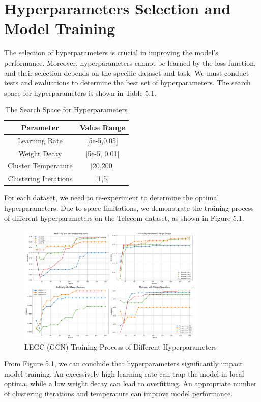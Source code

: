 \documentclass[ %
                    author={Tengyao Tu},
                supervisor={Dr. James Pope},
                    degree={MSc},
                     title={A New Perspective on Graph Community Detection: Combining Traditional Methods with Deep Learning Approaches},
                  subtitle={Applying to Telecom Networks and Diverse Datasets},
                      type={},
                      year={2024}]{dissertation}
\begin{document}
\section{Hyperparameters Selection and Model Training}
The selection of hyperparameters is crucial in improving the model's performance. Moreover, hyperparameters cannot be learned by the loss function, and their selection depends on the specific dataset and task. We must conduct tests and evaluations to determine the best set of hyperparameters. The search space for hyperparameters is shown in Table 5.1.
\begin{table}[!htbp] 
\centering 
\label{Basic Infomation} 
\caption{The Search Space for Hyperparameters} 
\vspace{5pt} 
\begin{tabular}{cc} 
\hline 
Parameter &Value Range \\ 
\hline
Learning Rate& [5e-5,0.05]\\
Weight Decay&[5e-5, 0.01]\\
Cluster Temperature&[20,200]\\
Clustering Iterations&[1,5]\\
\hline
\end{tabular}
\end{table}
For each dataset, we need to re-experiment to determine the optimal hyperparameters. Due to space limitations, we demonstrate the training process of different hyperparameters on the Telecom dataset, as shown in Figure 5.1.
\begin{figure}[h] %
    \centering
    \includegraphics[width=0.8\textwidth]{Figure_9.png} %
    \caption{LEGC (GCN) Training Process of Different Hyperparameters}
    \label{virtual Graph Data Map}
\end{figure}
From Figure 5.1, we can conclude that hyperparameters significantly impact model training. An excessively high learning rate can trap the model in local optima, while a low weight decay can lead to overfitting. An appropriate number of clustering iterations and temperature can improve model performance. 
\end{document}
